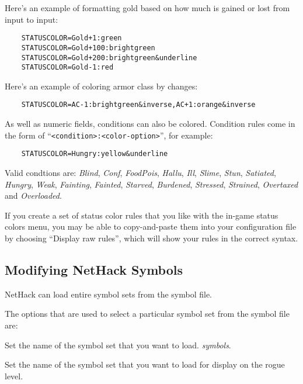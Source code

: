 Here's an example of formatting gold based on how much is gained or lost from
input to input:

\begin{verbatim}
    STATUSCOLOR=Gold+1:green
    STATUSCOLOR=Gold+100:brightgreen
    STATUSCOLOR=Gold+200:brightgreen&underline
    STATUSCOLOR=Gold-1:red
\end{verbatim}

Here's an example of coloring armor class by changes:

\begin{verbatim}
    STATUSCOLOR=AC-1:brightgreen&inverse,AC+1:orange&inverse
\end{verbatim}

As well as numeric fields, conditions can also be colored.  Condition rules
come in the form of ``{\tt <condition>:<color-option>}'', for example:

\begin{verbatim}
    STATUSCOLOR=Hungry:yellow&underline
\end{verbatim}

Valid condtions are: {\it Blind}, {\it Conf}, {\it FoodPois}, {\it Hallu},
{\it Ill}, {\it Slime}, {\it Stun}, {\it Satiated}, {\it Hungry}, {\it Weak},
{\it Fainting}, {\it Fainted}, {\it Starved}, {\it Burdened}, {\it Stressed},
{\it Strained}, {\it Overtaxed} and {\it Overloaded}.

If you create a set of status color rules that you like with the in-game
status colors menu, you may be able to copy-and-paste them into your
configuration file by choosing ``Display raw rules'', which will show your
rules in the correct syntax.

\subsection*{Modifying NetHack Symbols}

NetHack can load entire symbol sets from the symbol file.

The options that are used to select a particular symbol set from the 
symbol file are:

\blist{}
\item[\ib{symset}]
Set the name of the symbol set that you want to load.
{\it symbols\/}.

\item[\ib{roguesymset}]
Set the name of the symbol set that you want to load for display 
on the rogue level.
\elist

